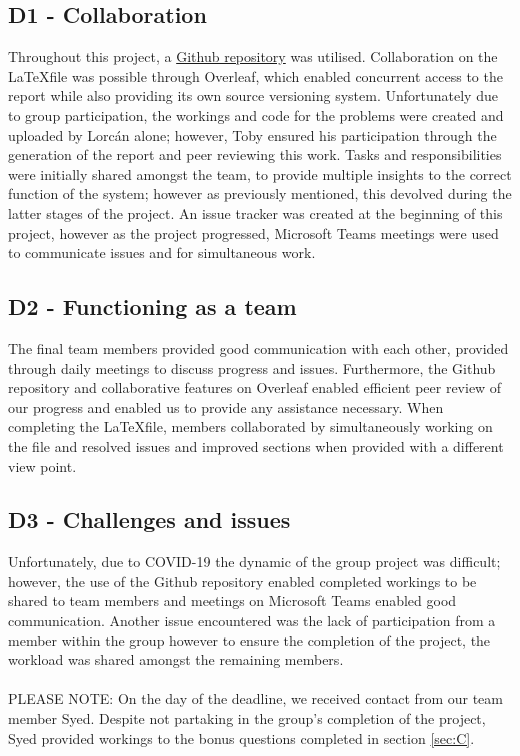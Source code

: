 \documentclass[a4paper,10pt,reqno]{amsart}
\numberwithin{equation}{section}
\begin{document}
\subsection{D1 - Collaboration}
\par Throughout this project, a \href{https://github.com/Lorcan-Q/Control_Coursework}{Github repository} was utilised. Collaboration on the \LaTeX\;file was possible through Overleaf, which enabled concurrent access to the report while also providing its own source versioning system. Unfortunately due to group participation, the workings and code for the problems were created and uploaded by Lorcán alone; however, Toby ensured his participation through the generation of the report and peer reviewing this work. Tasks and responsibilities were initially shared amongst the team, to provide multiple insights to the correct function of the system; however as previously mentioned, this devolved during the latter stages of the project. An issue tracker was created at the beginning of this project, however as the project progressed, Microsoft Teams meetings were used to communicate issues and for simultaneous work.

\subsection{D2 - Functioning as a team}
\par The final team members provided good communication with each other, provided through daily meetings to discuss progress and issues. Furthermore, the Github repository and collaborative features on Overleaf enabled efficient peer review of our progress and enabled us to provide any assistance necessary.  When completing the \LaTeX\;file, members collaborated by simultaneously working on the file and resolved issues and improved sections when provided with a different view point.


\subsection{D3 - Challenges and issues}
\par Unfortunately, due to COVID-19 the dynamic of the group project was difficult; however, the use of the Github repository enabled completed workings to be shared to team members and meetings on Microsoft Teams enabled good communication. Another issue encountered was the lack of participation from a member within the group however to ensure the completion of the project, the workload was shared amongst the remaining members.\\
\\
PLEASE NOTE: On the day of the deadline, we received contact from our team member Syed. Despite not partaking in the group's completion of the project, Syed provided workings to the bonus questions completed in section \ref{sec:C}. 
\end{document}
